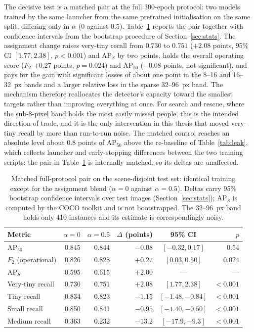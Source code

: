 The decisive test is a matched pair at the full 300-epoch protocol: two models
trained by the same launcher from the same pretrained initialisation on the same
split, differing only in $\alpha$ ($0$ against $0.5$). Table~\ref{tab:d2pair}
reports the pair together with confidence intervals from the bootstrap procedure
of Section~\ref{sec:stats}. The assignment change raises very-tiny recall from
$0.730$ to $0.751$ ($+2.08$ points, 95\% CI $[1.77, 2.38]$, $p<0.001$) and
$\mathrm{AP}_S$ by two points, holds the overall operating score ($F_2$ $+0.27$
points, $p=0.024$) and $\mathrm{AP}_{50}$ ($-0.08$ points, not significant), and
pays for the gain with significant losses of about one point in the 8--16 and
16--32~px bands and a larger relative loss in the sparse 32--96~px band. The
mechanism therefore reallocates the detector's capacity toward the smallest
targets rather than improving everything at once. For search and rescue, where
the sub-8-pixel band holds the most easily missed people, this is the intended
direction of trade, and it is the only intervention in this thesis that moved
very-tiny recall by more than run-to-run noise. The matched control reaches an
absolute level about $0.8$ points of $\mathrm{AP}_{50}$ above the re-baseline of
Table~\ref{tab:leak}, which reflects launcher and early-stopping differences
between the two training scripts; the pair in Table~\ref{tab:d2pair} is
internally matched, so its deltas are unaffected.

\begin{table}[tbp]
  \centering
  \caption{Matched full-protocol pair on the scene-disjoint test set: identical
  training except for the assignment blend ($\alpha=0$ against $\alpha=0.5$).
  Deltas carry 95\% bootstrap confidence intervals over test images
  (Section~\ref{sec:stats}); $\mathrm{AP}_S$ is computed by the COCO toolkit and
  is not bootstrapped. The 32--96~px band holds only 410 instances and its
  estimate is correspondingly noisy.}
  \label{tab:d2pair}
  \setlength{\tabcolsep}{4.5pt}
  \begin{tabular}{@{}l r r r c r@{}}
    \toprule
    Metric & $\alpha=0$ & $\alpha=0.5$ & $\Delta$ (points) & 95\% CI & $p$ \\
    \midrule
    $\mathrm{AP}_{50}$    & 0.845 & 0.844 & $-0.08$ & $[-0.32, 0.17]$ & 0.54 \\
    $F_2$ (operational)   & 0.826 & 0.828 & $+0.27$ & $[0.03, 0.50]$  & 0.024 \\
    $\mathrm{AP}_S$       & 0.595 & 0.615 & $+2.00$ & --- & --- \\
    Very-tiny recall      & 0.730 & 0.751 & $+2.08$ & $[1.77, 2.38]$  & $<0.001$ \\
    Tiny recall           & 0.834 & 0.823 & $-1.15$ & $[-1.48, -0.84]$ & $<0.001$ \\
    Small recall          & 0.850 & 0.841 & $-0.95$ & $[-1.40, -0.50]$ & $<0.001$ \\
    Medium recall         & 0.363 & 0.232 & $-13.2$ & $[-17.9, -9.3]$ & $<0.001$ \\
    \bottomrule
  \end{tabular}
\end{table}

